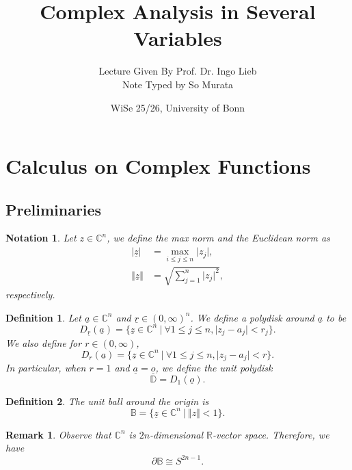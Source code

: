 \documentclass{article}
\title{Complex Analysis in Several Variables}
\author{Lecture Given By Prof. Dr. Ingo Lieb\\ Note Typed by So Murata}
\date{WiSe 25/26, University of Bonn}
\newtheorem{definition}{Definition}[section]
\newtheorem{notation}{Notation}[section]
\newtheorem{remark}{Remark}[section]
\newcommand{\R}[0]{\mathbb{R}}
\newcommand{\C}[0]{\mathbb{C}}
\begin{document}
\maketitle
\section{Calculus on Complex Functions}
\subsection{Preliminaries}

\begin{notation}Let $z\in\C^n$, we define the max norm and the Euclidean norm as 
\begin{align*}
\vert \underline{z}\vert &= \max_{i\leq j\leq n}\vert z_j\vert,\\
\Vert \underline{z}\Vert &= \sqrt{\sum_{j=1}^n\vert z_j\vert^2},
\end{align*}
respectively.
\end{notation}
\begin{definition}
Let $\underline{a}\in\C^n$ and $\underline{r}\in(0,\infty)^n$. We define a polydisk around $\underline{a}$ to be
\begin{equation*}
D_{\underline{r}}(\underline{a}) = \{\underline{z}\in\C^n\:|\: \forall 1\leq j\leq n, \vert z_j-a_j\vert <r_j\}.
\end{equation*}
We also define for $r\in(0,\infty)$,
\begin{equation*}
D_{r}(\underline{a}) = \{\underline{z}\in\C^n\:|\: \forall 1\leq j\leq n, \vert z_j-a_j\vert <r\}.
\end{equation*}
In particular, when $r=1$ and $\underline{a}=\underline{o}$, we define the unit polydisk
\begin{equation*}
\mathbb{D} = D_1(\underline{o}).
\end{equation*}
\end{definition}


\begin{definition}
The unit ball around the origin is 
\begin{equation*}
\mathbb{B} = \{\underline{z}\in\C^n\:|\: \Vert z\Vert < 1\}.
\end{equation*}
\end{definition}

\begin{remark}
Observe that $\C^n$ is $2n$-dimensional $\R$-vector space. Therefore, we have
\begin{equation*}
\partial \mathbb{B} \cong S^{2n-1}.
\end{equation*}
\end{remark}
\end{document}

